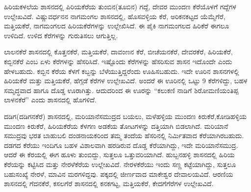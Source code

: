 ಹಿರಿಯಕಳಲೆಯ ಶಾಸನದಲ್ಲಿ ಪಿರಿಯಕೆರೆಯ ತುಂಬಿನ(ತೂಬಿನ) ಗದ್ದೆ, ದೇವರ ಮುಂದಣ ಕೆರೆಯೊಳಗೆ ಗದ್ದೆಗಳ ಉಲ್ಲೇಖವಿದೆ. ವಿಷ್ಣುವರ್ಧನನ ನಾಗಮಂಗಲ ಶಾಸನದಲ್ಲಿ, ಹೊಸವಳ್ಳಿಯ ಕೆರೆ, ಅರಿಕನಕಟ್ಟದ ಯೆಮ್ಮೆಗೆರೆ, ಮತ್ತಿಯಕೆರೆ, ನಾಗಮಂಗಲದ ಹಿರಿಯಕೆರೆಗಳನ್ನು ಉಲ್ಲೇಖಿಸಿದೆ. ಈ ಪೈಕಿ ನಾಗಮಂಗಲದ ಹಿರಿಕೆರೆ ಈಗಲೂ ಉಳಿದಿದೆ. ಉಳಿದ ಕೆರೆಗಳನ್ನು ಗುರುತಿಸಲು ಆಗುತ್ತಿಲ್ಲ.

ಲಾಲನಕೆರೆ ಶಾಸನದಲ್ಲಿ ಕೊತ್ತನಕೆರೆ, ಮತ್ತಿಯಕೆರೆ, ದಾವಂಣನ ಕೆರೆ, ಬೀಚೆಯನಕೆರೆ, ದೇವರಕೆರೆ, ಹಿರಿಯಕೆರೆ, ಕಬ್ಬಿನಕೆರೆ ಎಂಬ ಏಳು ಕೆರೆಗಳನ್ನು ಹೆಸರಿಸಿದೆ. ಇಷ್ಟೊಂದು ಕೆರೆಗಳನ್ನು ಹೆಸರಿಸುವ ಶಾಸನ ಇದೊಂದೇ ಎಂದು ಹೇಳಬಹುದು. ಕಬ್ಬಿನ ಕೆರೆಯ ಕೆಳಗೆ ಕಬ್ಬನ್ನು ಬೆಳೆಯುತ್ತಿದ್ದರೆಂದು ಊಹಿಸಬಹುದು. ಇದೇ ಊರಿನ ಶಾಸನಗಳಲ್ಲಿ ಹಿರಿಯಕೆರೆ ಮತ್ತು ಮತ್ತಿಯಕೆರೆ, ಹೆಗ್ಗಡೆ ಕೆರೆಗಳ ಉಲ್ಲೇಖವಿದೆ. ಅಂದರೆ ಈ ಊರಿನಲ್ಲಿ ಒಟ್ಟು 9 ಕೆರೆಗಳಿದ್ದು, ಬಹಳ ಸಮೃದ್ಧವಾದ ಹಾಗೂ ದೊಡ್ಡ ಊರಾಗಿತ್ತು. ಆದುದರಿಂದ ಈ ಊರನ್ನು “ಕಲುಕಣಿ ನಾಡಿಗೆ ಶಿರೋಮಣಿಯಂತಿಪ್ಪ ಲಾಳನಕೆರೆ” ಎಂದು ಶಾಸನದಲ್ಲಿ ಹೊಗಳಿದೆ.

ದಡಿಗ(ದಡಿಗನಕೆರೆ) ಶಾಸನದಲ್ಲಿ, ಮರಿಯಾನೆಸಮುದ್ರದ ಬಯಲು, ಮಳೆಹಳ್ಳಿಯ ಮುಂದಣ ಕಿರುಕೆರೆ,\break ಕೋಡಿಹಳ್ಳಿಯ ಮುಂದಣ ಕಿರುಕೆರೆ, ಹಿರಿಯಕೆರೆಯ ಕೆಳಗಣ ಅಡಕೆಯ ತೋಟಗಳನ್ನು ದತ್ತಿಯಾಗಿ ಬಿಡಲಾಗಿದೆ. ಮರಿಯಾನೆ ಸಮುದ್ರವು ಭರತ ಬಾಹುಬಲಿ ದಂಡನಾಯಕರಿಂದ ತಮ್ಮ ತಂದೆಯ ಹೆಸರಿನಲ್ಲಿ ನಿರ್ಮಿತವಾದ ಕೆರೆಯಾಗಿರಬಹುದು. ದಡಗದ ಕೆರೆಯು ಇಂದಿಗೂ ಬಹಳ ವಿಶಾಲವಾಗಿ ಹರಡಿರುವ ದೊಡ್ಡ ಕೆರೆಯಾಗಿದ್ದು, ಇದೇ ಮರಿಯಾನೆಸಮುದ್ರ. ಆದರೆ ಈ ಕೆರಯಲ್ಲಿ ಈಗ ಹೂಳು ತುಂಬಿದ್ದು, ಸುತ್ತಲೂ ಒತ್ತುವರಿಯಾಗಿದೆ. ಹುಬ್ಬನಹಳ್ಳಿ ಶಾಸನದಲ್ಲಿ ಹಿರಿಯ ಕೆರೆಯನ್ನು ಕಟ್ಟಿಸಿದ ಮತ್ತು ನೇರಳೆಕೆರೆಯ ಉಲ್ಲೇಖವಿದೆ. ನೇರಳಕೆರೆಯು ಇಂದು ಸಣ್ಣ ಕಟ್ಟೆಯಾಗಿದ್ದು, ಸುತ್ತಲೂ ಬಹುಸಂಖ್ಯೆ ನೇರಳೆ, ಮಾವಿನ ಮರಗಳಿದ್ದವು. ಪಕ್ಕದಲ್ಲಿ ಜೀರ್ಣವಾದ ಮಾಕೇಶ್ವರ ದೇವಾಲಯವಿದೆ.  ಆರಣಿಯ ಶಾಸನದಲ್ಲಿ ಗೆದನಕೆರೆ, ಕಸಲಗೆರೆ ಶಾಸನದಲ್ಲಿ ಕನಕಗಟ್ಟ, ಮತ್ತಿಯಕೆರೆ, ಕೇದಗೆಗೆರೆಗಳ ಉಲ್ಲೇಖವಿದೆ.

